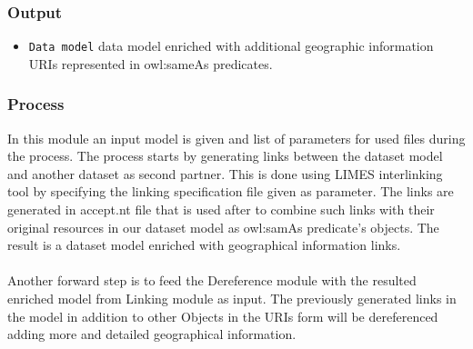 \documentclass[a4paper,twoside,bibtotoc,abstracton,12pt,BCOR=15mm]{article}
\begin{document}
\subsubsection{Output}
\begin{itemize}
 \item \texttt{Data model} data model enriched with additional geographic information URIs represented in owl:sameAs predicates.
\end{itemize}

\subsubsection{Process}
In this module an input model is given and list of parameters for used files during the process. The process starts by generating links between the dataset model and another dataset as second partner. This is done using LIMES interlinking tool by specifying the linking specification file given as parameter. The links are generated in accept.nt file that is used after to combine such links with their original resources in our dataset model as owl:samAs predicate's objects. The result is a dataset model enriched with geographical information links. \\ \\
Another forward step is to feed the Dereference module with the resulted enriched model from Linking module as input. The previously generated links in the model in addition to other Objects in the URIs form will be dereferenced adding more and detailed geographical information.
\end{document}
